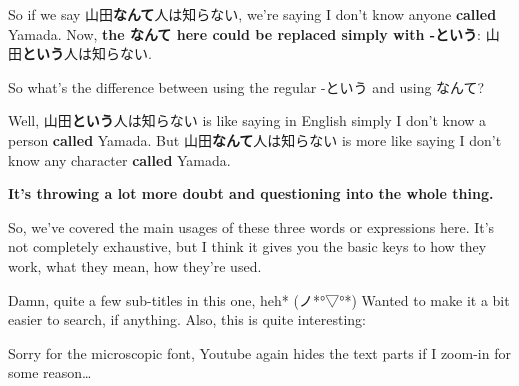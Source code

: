 {}

So if we say 山田{\bf なんて}人は知らない, we're saying I don't know anyone {\bf called} Yamada. Now, {\bf the なんて here could be replaced simply with -という}: 山田{\bf という}人は知らない.

So what's the difference between using the regular -という and using なんて?

\thinrule

Well, 山田{\bf という}人は知らない is like saying in English simply I don't know a person {\bf called} Yamada. But 山田{\bf なんて}人は知らない is more like saying I don't know any character {\bf called} Yamada.

{\bf It's throwing a lot more doubt and questioning into the whole thing.}

So, we've covered the main usages of these three words or expressions here. It's not completely exhaustive, but I think it gives you the basic keys to how they work, what they mean, how they're used.

Damn, quite a few sub-titles in this one, heh* (ノ*°▽°*)\crlf
Wanted to make it a bit easier to search, if anything. Also, this is quite interesting:

{}

{}

Sorry for the microscopic font, Youtube again hides the text parts if I zoom-in for some reason\ldots{}

\stopsectionlevel

\stopsectionlevel

\stopsectionlevel
